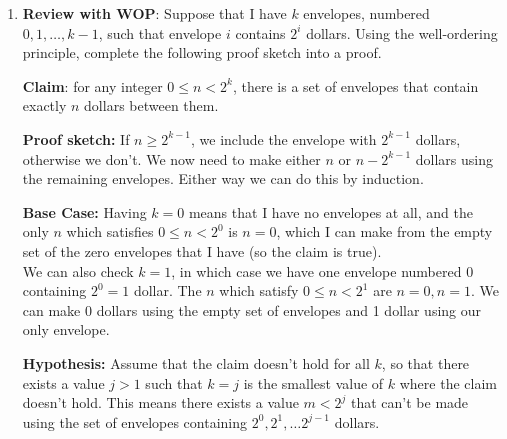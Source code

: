 \documentclass[11pt,fleqn]{article}
\begin{document}
\begin{enumerate}
\begin{enumerate}
{\bf Induction Hypothesis:} Assume $Q(n) = (n+1)^3 - 1$ \\
{\bf Induction Step:} We are looking for $Q(n+1) = ((n+1)+1)^3 - 1 = (n+2)^3 - 1$
\begin{eqnarray*}
Q(n+1) &=& Q(n) + 3(n+1)^2 + 3(n+1) + 1 \\
       &=& (n+1)^3 - 1 + 3(n+1)^2 + 3(n+1) + 1 \\
       &=& n^3 + 3n^2 + 3n + 1 + 3n^2 + 6n + 3 + 3n + 3 + 1 - 1 \\
       &=& n^3 + 6n^2 + 12n + 8 - 1 \\
       &=& (n+2)^3 - 1
\end{eqnarray*}
\end{enumerate}

\newpage
\item \textbf{Review with WOP}: Suppose that I have $k$
envelopes, numbered $0, 1, \ldots, k-1$, such that envelope $i$ contains $2^i$ dollars.
Using the well-ordering principle, complete the following proof sketch into a proof.

\textbf{Claim}: for any integer $0 \leq n < 2^k$, there 
is a set of envelopes that contain exactly $n$ dollars between them.

\textbf{Proof sketch:} If $n \geq 2^{k-1}$, we include the envelope with $2^{k-1}$ dollars,
otherwise we don't.
We now need to make either $n$ or $n-2^{k-1}$ dollars
using the remaining envelopes. Either way we can do this by induction.

\textbf{Base Case:} Having $k=0$ means that I have no envelopes at all, and the only $n$ which satisfies $0 \leq n < 2^0$ is $n=0$, which I can make from the empty set of the zero envelopes that I have (so the claim is true). \\ We can also check $k=1$, in which case we have one envelope numbered 0 containing $2^0 = 1$ dollar. The $n$ which satisfy $0 \leq n < 2^1$ are $n=0,n=1$. We can make 0 dollars using the empty set of envelopes and 1 dollar using our only envelope.

\textbf{Hypothesis:} Assume that the claim doesn't hold for all $k$, so that there exists a value $j>1$ such that $k=j$ is the smallest value of $k$ where the claim doesn't hold. This means there exists a value $m < 2^j$ that can't be made using the set of envelopes containing $2^0, 2^1, \ldots 2^{j-1}$ dollars.


\end{enumerate}
\end{document}
